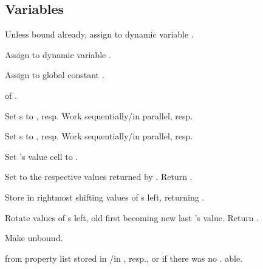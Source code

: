 \subsection{Variables}

\begin{LIST}{1cm}

  Unless bound already, assign  to dynamic variable
  . 

  Assign  to dynamic variable .

  Assign  to global constant .

   of .

  Set s to , resp. Work sequentially/in
  parallel, resp. 

  Set s to , resp. Work sequentially/in
  parallel, resp. 

  Set 's value cell to .

  Set  to the respective values returned by
  . Return .

  Store  in rightmost  shifting values of
  s left, returning . 

  Rotate values of s left, old first becoming new last
  's value. Return \retval{\NIL}.

  Make  unbound.

  \label{:property_lists}
   from property list stored in
  /in , resp., or  if
  there was no . able.


\end{LIST}
